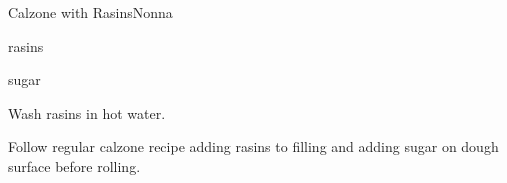 \begin{recipe}{Calzone with Rasins}{Nonna}{}

\begin{ingredients}
\item rasins
\item sugar
\end{ingredients}

\begin{directions}
\item Wash rasins in hot water.
\item Follow regular calzone recipe adding rasins to filling and adding sugar on dough surface before rolling.
\end{directions}

\end{recipe}
